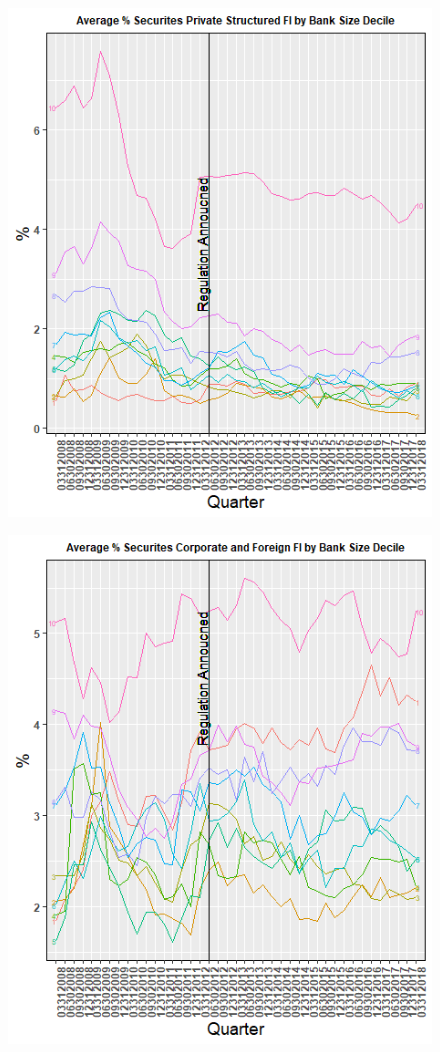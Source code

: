 \documentclass[preprint,12pt]{elsarticle}
\begin{document}
\begin{figure}[h!]
\centering
\caption{}
\label{Figure 6}
\includegraphics[width = .97\linewidth]{Rplot04}
\end{figure} 

\begin{figure}[h!]
\centering
\caption{}
\label{Figure 7}
\includegraphics[width = .97\linewidth]{Rplot05}
\end{figure}
\end{document}
